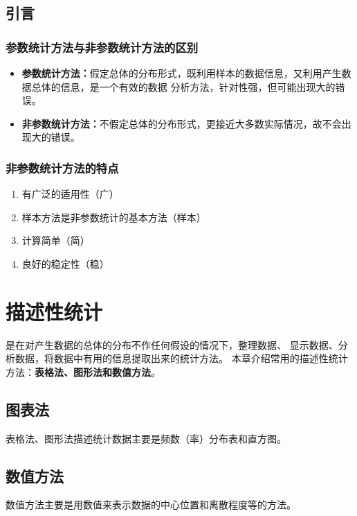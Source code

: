 \documentclass[lang=cn,10pt]{elegantbook}
\begin{document}
\section{引言}
\subsection{参数统计方法与非参数统计方法的区别}
\begin{itemize}
    \item \textbf{参数统计方法：}假定总体的分布形式，既利用样本的数据信息，又利用产生数据总体的信息，是一个有效的数据
          分析方法，针对性强，但可能出现大的错误。
    \item \textbf{非参数统计方法：}不假定总体的分布形式，更接近大多数实际情况，故不会出现大的错误。
\end{itemize}

\subsection{非参数统计方法的特点}

\begin{enumerate}[(1)]
    \item 有广泛的适用性（广）
    \item 样本方法是非参数统计的基本方法（样本）
    \item 计算简单（简）
    \item 良好的稳定性（稳）
\end{enumerate}

\chapter{描述性统计}
\begin{definition}[描述性统计]
    是在对产生数据的总体的分布不作任何假设的情况下，整理数据、
    显示数据、分析数据，将数据中有用的信息提取出来的统计方法。
    本章介绍常用的描述性统计方法：\textbf{表格法、图形法和数值方法}。
\end{definition}

\section{图表法}
表格法、图形法描述统计数据主要是频数（率）分布表和直方图。

\section{数值方法}
数值方法主要是用数值来表示数据的中心位置和离散程度等的方法。
\end{document}
